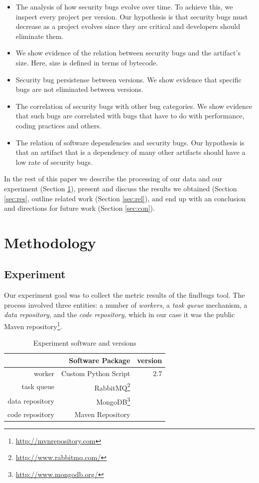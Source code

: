 \documentclass[conference]{IEEEtran}
\begin{document}
\begin{itemize}
	\item The analysis of how security bugs evolve over time. To achieve
this, we inspect every project per version. Our hypothesis is that security
bugs must decrease as a project evolves since they are critical and developers
should eliminate them.
	\item We show evidence of the relation between security bugs and the artifact's size.  Here, size is
defined in terms of bytecode.
	\item Security bug persistense between versions. We show evidence that specific bugs are
not eliminated between versions.
	\item The correlation of security bugs with other bug categories. We
show evidence that such bugs are correlated with bugs that have to do with
performance, coding practices and others.
	\item The relation of software dependencies and security bugs. Our
hypothesis is that an artifact that is a dependency of many other artifacts
should have a low rate of security bugs. 
\end{itemize}

In the rest of this paper we
describe the processing of our data and our experiment (Section \ref{sec:meth}),
present and discuss the results we obtained (Section \ref{sec:res},
outline related work (Section \ref{sec:rel}),
and end up with an conclusion and directions for future work (Section \ref{sec:con}).

\section{Methodology}
\label{sec:meth}

\subsection{Experiment}
\label{sec:exp}

Our experiment goal was to collect the metric results of the findbugs tool.
The process involved three entities: a number of \textit{workers}, a \textit{task queue} mechanism,
a \textit{data repository}, and the \textit{code repository}, which in our case it was the public Maven 
repository\footnote{\url{http://mvnrepository.com}}.

\begin{table}
\centering
\caption{Experiment software and versions}
\label{tbl:soft-version}
\begin{tabular}{r r r}
\hline
 & Software Package & version\\
 \hline
worker & Custom Python Script & 2.7\\
task queue & RabbitMQ\footnote{\url{http://www.rabbitmq.com/}} & \\
data repository & MongoDB\footnote{\url{http://www.mongodb.org/}} & \\
code repository & Maven Repository & \\
\hline
\end{tabular}
\end{table}
\end{document}
